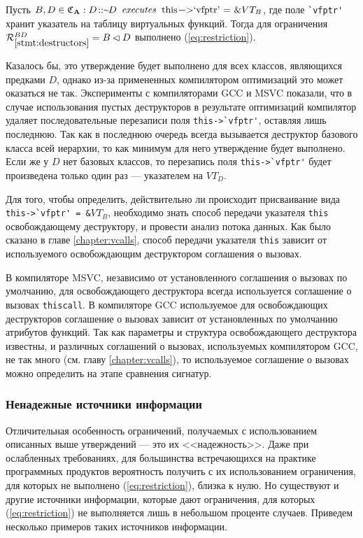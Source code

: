 \begin{statement}\label{stmt:destructors}\label{stmt:last_good}
Пусть $B, D \in \gCa: D \text{\lstinline{::~}} \! D \enspace \executes \enspace \text{\lstinline{this->`vfptr'}}\text{~\lstinline{= &}}VT_B$, где поле \lstinline{`vfptr'} хранит указатель на таблицу виртуальных функций. Тогда для ограничения $\mathcal{R}_{\ref{stmt:destructors}}^{BD} = B \lhd D$ выполнено (\ref{eq:restriction}).
\end{statement}

Казалось бы, это утверждение будет выполнено для всех классов, являющихся предками $D$, однако из-за примененных компилятором оптимизаций это может оказаться не так. Эксперименты с компиляторами GCC и MSVC показали, что в случае использования пустых деструкторов в результате оптимизаций компилятор удаляет последовательные перезаписи поля \lstinline{this->`vfptr'}, оставляя лишь последнюю. Так как в последнюю очередь всегда вызывается деструктор базового класса всей иерархии, то как минимум для него утверждение будет выполнено. Если же у $D$ нет базовых классов, то перезапись поля \lstinline{this->`vfptr'} будет произведена только один раз --- указателем на $VT_D$.

Для того, чтобы определить, действительно ли происходит присваивание вида \lstinline{this->`vfptr'}\lstinline{ = &}$VT_B$, необходимо знать способ передачи указателя \lstinline{this} освобождающему деструктору, и провести анализ потока данных. Как было сказано в главе \ref{chapter:vcalls}, способ передачи указателя \lstinline{this} зависит от используемого освобождающим деструктором соглашения о вызовах.

В компиляторе MSVC, независимо от установленного соглашения о вызовах по умолчанию, для освобождающего деструктора всегда используется соглашение о вызовах \lstinline{thiscall}. В компиляторе GCC используемое для освобождающих деструкторов соглашение о вызовах зависит от установленных по умолчанию атрибутов функций. Так как параметры и структура освобождающего деструктора известны, и различных соглашений о вызовах, используемых компилятором GCC, не так много (см. главу \ref{chapter:vcalls}), то используемое соглашение о вызовах можно определить на этапе сравнения сигнатур.





\subsubsection{Ненадежные источники информации}\label{chapter:unreliable}
Отличительная особенность ограничений, получаемых с использованием описанных выше утверждений --- это их <<надежность>>. Даже при ослабленных требованиях, для большинства встречающихся на практике программных продуктов вероятность получить с их использованием ограничения, для которых не выполнено (\ref{eq:restriction}), близка к нулю. Но существуют и другие источники информации, которые дают ограничения, для которых (\ref{eq:restriction}) не выполняется лишь в небольшом проценте случаев. Приведем несколько примеров таких источников информации.

